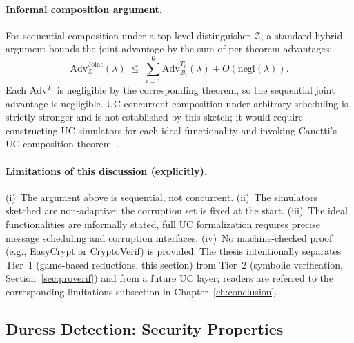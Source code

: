 \paragraph{Informal composition argument.} For sequential composition under a top-level distinguisher $\mathcal{Z}$, a standard hybrid argument bounds the joint advantage by the sum of per-theorem advantages:
\begin{equation*}
    \mathrm{Adv}^{\mathrm{Joint}}_{\mathcal{Z}}(\lambda) \;\leq\; \sum_{i=1}^{6} \mathrm{Adv}^{T_i}_{\mathcal{B}_i}(\lambda) + O(\mathrm{negl}(\lambda)).
\end{equation*}
Each $\mathrm{Adv}^{T_i}$ is negligible by the corresponding theorem, so the sequential joint advantage is negligible. UC concurrent composition under arbitrary scheduling is strictly stronger and is not established by this sketch; it would require constructing UC simulators for each ideal functionality and invoking Canetti's UC composition theorem~\cite[Theorem 13]{canetti2001uc}.

\paragraph{Limitations of this discussion (explicitly).} (i)~The argument above is sequential, not concurrent. (ii)~The simulators sketched are non-adaptive; the corruption set is fixed at the start. (iii)~The ideal functionalities are informally stated, full UC formalization requires precise message scheduling and corruption interfaces. (iv)~No machine-checked proof (e.g., EasyCrypt or CryptoVerif) is provided. The thesis intentionally separates Tier~1 (game-based reductions, this section) from Tier~2 (symbolic verification, Section~\ref{sec:proverif}) and from a future UC layer; readers are referred to the corresponding limitations subsection in Chapter~\ref{ch:conclusion}.

\subsection{Duress Detection: Security Properties}
\label{subsec:duress-security}


